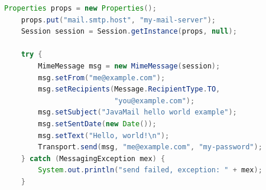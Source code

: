 \begin{lstlisting}[language=Java,basicstyle=\tiny,caption=Contoh Kode Pengiriman Email]
Properties props = new Properties();
    props.put("mail.smtp.host", "my-mail-server");
    Session session = Session.getInstance(props, null);

    try {
        MimeMessage msg = new MimeMessage(session);
        msg.setFrom("me@example.com");
        msg.setRecipients(Message.RecipientType.TO,
                          "you@example.com");
        msg.setSubject("JavaMail hello world example");
        msg.setSentDate(new Date());
        msg.setText("Hello, world!\n");
        Transport.send(msg, "me@example.com", "my-password");
    } catch (MessagingException mex) {
        System.out.println("send failed, exception: " + mex);
    }
		
\end{lstlisting}


